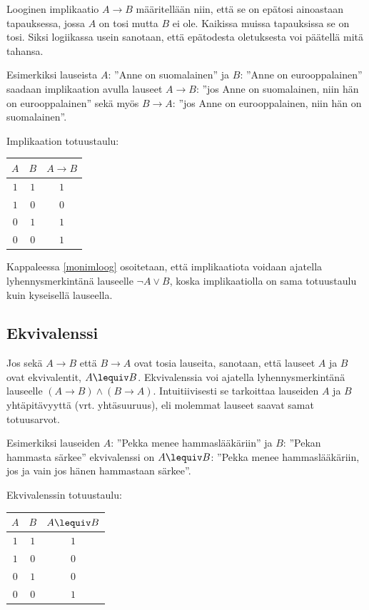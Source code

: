 Looginen implikaatio $A\to B$  määritellään niin, että se on epätosi ainoastaan tapauksessa, jossa $A$ on tosi mutta $B$ ei ole. Kaikissa muissa tapauksissa se on tosi. Siksi logiikassa usein sanotaan, että epätodesta oletuksesta voi päätellä mitä tahansa.


Esimerkiksi lauseista $A$: ''Anne on suomalainen'' ja $B$: ''Anne on eurooppalainen'' saadaan implikaation avulla lauseet $A \to B$: ''jos Anne on suomalainen, niin hän on eurooppalainen'' sekä myös $B \to A$: ''jos Anne on eurooppalainen, niin hän on suomalainen''. 

Implikaation totuustaulu:

\bigskip

\begin{center}
\begin{tabular}{|c|c|c|}\hline
$A$ & $B$ & $A \to B$ \\ \hline
$1$ & $1$ & $1$\\ %
$1$ & $0$ & $0$\\
$0$ & $1$ & $1$\\
$0$ & $0$ & $1$\\ \hline
\end{tabular}
\end{center}

\bigskip

Kappaleessa \ref{monimloog} osoitetaan, että implikaatiota voidaan ajatella lyhennysmerkintänä lauseelle $\lnot A \lor B$, koska implikaatiolla on sama totuustaulu kuin kyseisellä lauseella.


\subsection*{Ekvivalenssi}
Jos sekä $A\to B$ että $B\to A$ ovat tosia lauseita, sanotaan, että lauseet $A$ ja $B$ ovat ekvivalentit, $A \lequiv B$. Ekvivalenssia voi ajatella lyhennysmerkintänä lauseelle $(A\to B) \land (B\to A)$. Intuitiivisesti se tarkoittaa lauseiden $A$ ja $B$ yhtäpitävyyttä (vrt. yhtäsuuruus), eli molemmat lauseet saavat samat totuusarvot.


Esimerkiksi lauseiden $A$: ''Pekka menee hammaslääkäriin'' ja $B$: ''Pekan hammasta särkee'' ekvivalenssi on $A \lequiv B$: ''Pekka menee hammaslääkäriin, jos ja vain jos hänen hammastaan särkee''.

\newpage

Ekvivalenssin totuustaulu:

\bigskip

\begin{center}
\begin{tabular}{|c|c|c|}\hline
$A$ & $B$ & $A \lequiv  B$ \\ \hline
$1$ & $1$ & $1$\\ %
$1$ & $0$ & $0$\\
$0$ & $1$ & $0$\\
$0$ & $0$ & $1$\\ \hline
\end{tabular}
\end{center}

